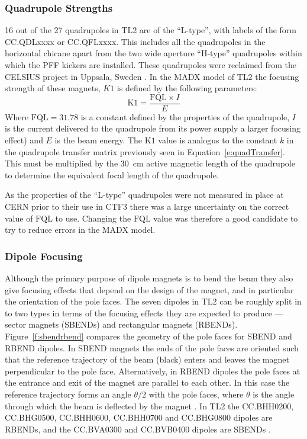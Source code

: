 \subsubsection{Quadrupole Strengths}
\label{sss:quadStrengths}

16 out of the 27 quadrupoles in TL2 are of the ``L-type'', with labels of the form CC.QDLxxxx or CC.QFLxxxx. This includes all the quadrupoles in the horizontal chicane apart from the two wide aperture ``H-type'' quadrupoles within which the PFF kickers are installed. These quadrupoles were reclaimed from the CELSIUS project in Uppsala, Sweden \cite{celsius}. In the MADX model of TL2 the focusing strength of these magnets, \(K1\) is defined by the following parameters:
\begin{equation}
\mathrm{K1} = \frac{\mathrm{FQL}\times I}{E}
\end{equation}
Where \(\mathrm{FQL} = 31.78\) is a constant defined by the properties of the quadrupole, \(I\) is the current delivered to the quadrupole from its power supply a larger focusing effect) and \(E\) is the beam energy. The \(\mathrm{K1}\) value is analogus to the constant \(k\) in the quadrupole transfer matrix previously seen in Equation~\ref{e:quadTransfer}. This must be multiplied by the 30~cm active magnetic length of the quadrupole to determine the equivalent focal length of the quadrupole.

As the properties of the ``L-type'' quadrupoles were not measured in place at CERN prior to their use in CTF3 there was a large uncertainty on the correct value of \(\mathrm{FQL}\) to use. Changing the \(\mathrm{FQL}\) value was therefore a good candidate to try to reduce errors in the MADX model.

\subsubsection{Dipole Focusing}
\label{sss:edgeFocusing}

Although the primary purpose of dipole magnets is to bend the beam they also give focusing effects that depend on the design of the magnet, and in particular the orientation of the pole faces. The seven dipoles in TL2 can be roughly split in to two types in terms of the focusing effects they are expected to produce --- sector magnets (SBENDs) and rectangular magnets (RBENDs). Figure~\ref{f:sbendrbend} compares the geometry of the pole faces for SBEND and RBEND dipoles. In SBEND magnets the ends of the pole faces are oriented such that the reference trajectory of the beam (black) enters and leaves the magnet perpendicular to the pole face. Alternatively, in RBEND dipoles the pole faces at the entrance and exit of the magnet are parallel to each other. In this case the reference trajectory forms an angle \(\theta/2\) with the pole faces, where \(\theta\) is the angle through which the beam is deflected by the magnet \cite{wiedemann}. In TL2 the CC.BHH0200, CC.BHG0500, CC.BHH0600, CC.BHH0700 and CC.BHG0800 dipoles are RBENDs, and the CC.BVA0300 and CC.BVB0400 dipoles are SBENDs \cite{tl2Magnets}.

